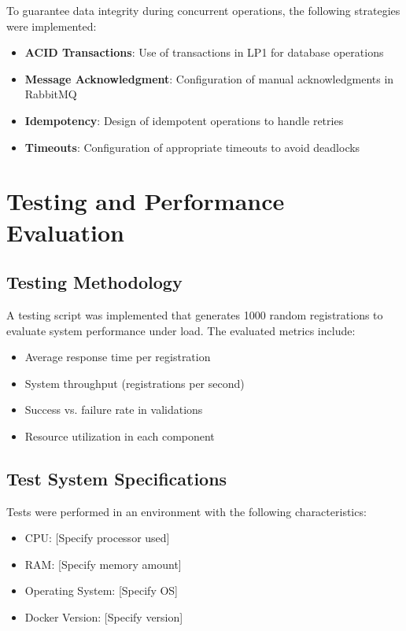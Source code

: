 \documentclass[10pt,a4paper]{article}
\theoremstyle{definition}
\theoremstyle{remark}
\begin{document}
To guarantee data integrity during concurrent operations, the following strategies were implemented:

\begin{itemize}
    \item \textbf{ACID Transactions}: Use of transactions in LP1 for database operations
    \item \textbf{Message Acknowledgment}: Configuration of manual acknowledgments in RabbitMQ
    \item \textbf{Idempotency}: Design of idempotent operations to handle retries
    \item \textbf{Timeouts}: Configuration of appropriate timeouts to avoid deadlocks
\end{itemize}

\section{Testing and Performance Evaluation}

\subsection{Testing Methodology}
A testing script was implemented that generates 1000 random registrations to evaluate system performance under load. The evaluated metrics include:

\begin{itemize}
    \item Average response time per registration
    \item System throughput (registrations per second)
    \item Success vs. failure rate in validations
    \item Resource utilization in each component
\end{itemize}

\subsection{Test System Specifications}
Tests were performed in an environment with the following characteristics:
\begin{itemize}
    \item CPU: [Specify processor used]
    \item RAM: [Specify memory amount]
    \item Operating System: [Specify OS]
    \item Docker Version: [Specify version]
\end{itemize}
\end{document}
